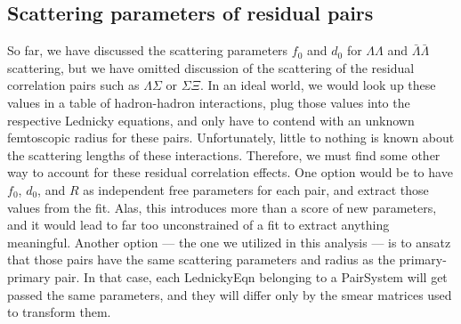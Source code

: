 \subsection{Scattering parameters of residual pairs}
\label{sec:ScatteringParams}


So far, we have discussed the scattering parameters $f_0$ and $d_0$ for $\Lambda\Lambda$ and $\bar{\Lambda}\bar{\Lambda}$ scattering, but we have omitted discussion of the scattering of the residual correlation pairs such as $\Lambda\Sigma$ or $\Sigma\Xi$.
In an ideal world, we would look up these values in a table of hadron-hadron interactions, plug those values into the respective Lednicky equations, and only have to contend with an unknown femtoscopic radius for these pairs.
Unfortunately, little to nothing is known about the scattering lengths of these interactions.
Therefore, we must find some other way to account for these residual correlation effects.
One option would be to have $f_0$, $d_0$, and $R$ as independent free parameters for each pair, and extract those values from the fit. 
Alas, this introduces more than a score of new parameters, and it would lead to far too unconstrained of a fit to extract anything meaningful.
Another option --- the one we utilized in this analysis --- is to ansatz that those pairs have the same scattering parameters and radius as the primary-primary pair.
In that case, each LednickyEqn belonging to a PairSystem will get passed the same parameters, and they will differ only by the smear matrices used to transform them.


